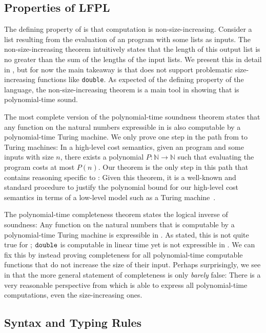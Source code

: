 \subsection{Properties of LFPL}

\enlargethispage{\baselineskip}

The defining property of \lfpl is that computation is non-size-increasing. Consider a list resulting from the evaluation of an \lfpl program with some lists as inputs. The non-size-increasing theorem intuitively states that the length of this output list is no greater than the sum of the lengths of the input lists. We present this in detail in , but for now the main takeaway is that \lfpl does not support problematic size-increasing functions like \lstinline{double}. As expected of the defining property of the language, the non-size-increasing theorem is a main tool in showing that \lfpl is polynomial-time sound.

The most complete version of the polynomial-time soundness theorem states that any function on the natural numbers expressible in \lfpl is also computable by a polynomial-time Turing machine. We only prove one step in the path from \lfpl to Turing machines: In a high-level cost semantics, given an \lfpl program and some inputs with size $n$, there exists a polynomial $P : \mathbb N \to \mathbb N$ such that evaluating the program costs at most $P(n)$. Our theorem is the only step in this path that contains reasoning specific to \lfpl: Given this theorem, it is a well-known and standard procedure to justify the polynomial bound for our high-level cost semantics in terms of a low-level model such as a Turing machine~\cite{Accattoli2019,blellochProvableTimeSpace1996}.

The polynomial-time completeness theorem states the logical inverse of soundness: Any function on the natural numbers that is computable by a polynomial-time Turing machine is expressible in \lfpl. As stated, this is not quite true for \lfpl; $\mathtt{double}$ is computable in linear time yet is not expressible in \lfpl. We can fix this by instead proving completeness for all polynomial-time computable functions that do not increase the size of their input. Perhaps surprisingly, we see in  that the more general statement of completeness is only \textit{barely} false: There is a very reasonable perspective from which \lfpl is able to express all polynomial-time computations, even the size-increasing ones.


\subsection{Syntax and Typing Rules}
\label{sec:lfpl-definition}

